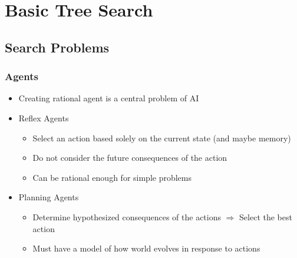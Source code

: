 \section{Basic Tree Search}

\subsection{Search Problems}

\subsubsection*{Agents}
\begin{itemize}
    \item Creating rational agent is a central problem of AI
    \item Reflex Agents
    \begin{itemize}
        \item Select an action based solely on the current state (and maybe memory)
        \item Do not consider the future consequences of the action
        \item Can be rational enough for simple problems
    \end{itemize}
    \item Planning Agents
    \begin{itemize}
        \item Determine hypothesized consequences of the actions $\Rightarrow$ Select the best action
        \item Must have a model of how world evolves in response to actions
    \end{itemize}
\end{itemize}

